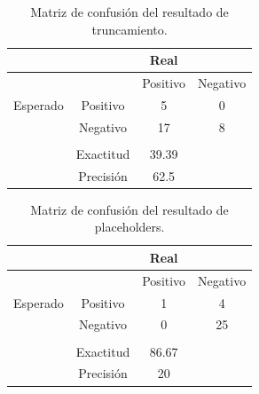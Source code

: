 \begin{table}[H]
	\centering
	\begin{tabular}{|c|c|c|c|}
		\hline
		& & Real &   \\
		\hline
		&          & Positivo & Negativo                   \\
		\hline
		Esperado & Positivo & 5& 0 \\
		\hline
		& Negativo & 		  17& 8                \\
		\hline
		&&&\\
		\hline
		&Exactitud& 39.39 & \\
		\hline
		&Precisión& 62.5 &\\
		\hline
	\end{tabular}
	\caption{Matriz de confusión del resultado de truncamiento.}
	\label{table:mt_trun_n}
\end{table}
\begin{table}[H]
	\centering
	\begin{tabular}{|c|c|c|c|}
		\hline
		& & Real &   \\
		\hline
		&          & Positivo & Negativo                   \\
		\hline
		Esperado & Positivo & 1& 4 \\
		\hline
		& Negativo & 		  0& 25                \\
		\hline
		&&&\\
		\hline
		&Exactitud& 86.67 & \\
		\hline
		&Precisión& 20 &\\
		\hline
	\end{tabular}
	\caption{Matriz de confusión del resultado de placeholders.}
	\label{table:mt_place_n}
\end{table}
